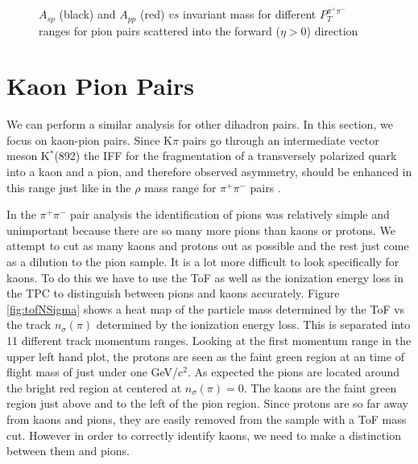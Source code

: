 \documentclass[letterpaper, abstract = on,listof=totoc, bibliography=totoc]{scrreprt}
\newcommand{\ptpair}{P_{T}^{\pi^+\pi^-}}
\newcommand{\pip}{\pi^+}
\newcommand{\pim}{\pi^-}
\newcommand{\pair}{$\pip\pim$ }
\newcommand{\nsigpi}{n_\sigma(\pi)}
\begin{document}
\begin{figure}
\begin{tabular}{cc}
\end{tabular}
\caption{$A_{sp}$ (black) and $A_{pp}$ (red) $vs$ invariant mass for different $\ptpair$ ranges for pion pairs scattered into the forward ($\eta > 0$) direction}
\label{fig:partWaveFits}
\end{figure}






\section{Kaon Pion Pairs}

We can perform a similar analysis for other dihadron pairs. In this section, we focus on kaon-pion pairs. Since K$\pi$ pairs go through an intermediate vector meson K$^*$(892) the IFF for the fragmentation of a transversely polarized quark into a kaon and a pion, and therefore observed asymmetry, should be enhanced in this range just like in the $\rho$ mass range for \pair pairs \cite{PhysRevLett.80.1166}. 

In the \pair pair analysis the identification of pions was relatively simple and unimportant because there are so many more pions than kaons or protons. We attempt to cut as many kaons and protons out as possible and the rest just come as a dilution to the pion sample. It is a lot more difficult to look specifically for kaons. To do this we have to use the ToF as well as the ionization energy loss in the TPC to distinguish between pions and kaons accurately. Figure \ref{fig:tofNSigma} shows a heat map of the particle mass determined by the ToF vs the track $\nsigpi$ determined by the ionization energy loss. This is separated into 11 different track momentum ranges. Looking at the first momentum range in the upper left hand plot, the protons are seen as the faint green region at an time of flight mass of just under one GeV/c$^2$. As expected the pions are located around the bright red region at centered at $\nsigpi = 0$. The kaons are the faint green region just above and to the left of the pion region. Since protons are so far away from kaons and pions, they are easily removed from the sample with a ToF mass cut. However in order to correctly identify kaons, we need to make a distinction between them and pions. 
\end{document}
